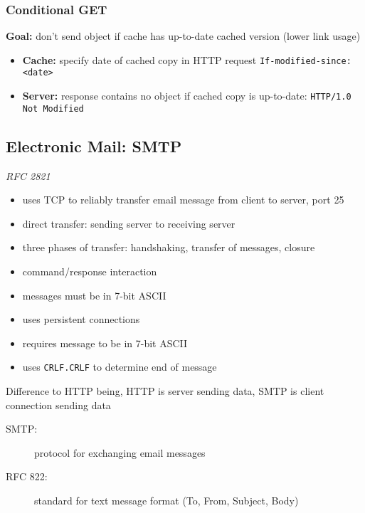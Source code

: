 \subsubsection{Conditional GET}
\begin{leftbar}
	\textbf{Goal:} don't send object if cache has up-to-date cached version (lower link usage)
\end{leftbar}
\begin{itemize}
	\item \textbf{Cache:} specify date of cached copy in HTTP request \texttt{If-modified-since: <date>}
	\item \textbf{Server:} response contains no object if cached copy is up-to-date: \texttt{HTTP/1.0 Not Modified}
\end{itemize}

\subsection{Electronic Mail: SMTP}\label{sec:smtp}
\textit{RFC 2821}
\begin{itemize}
	\item uses TCP to reliably transfer email message from client to server, port 25
	\item direct transfer: sending server to receiving server
	\item three phases of transfer: handshaking, transfer of messages, closure
	\item command/response interaction
	\item messages must be in 7-bit ASCII
	\item uses persistent connections
	\item requires message to be in 7-bit ASCII
	\item uses \texttt{CRLF.CRLF} to determine end of message
\end{itemize}
Difference to HTTP being, HTTP is server sending data, SMTP is client connection sending data\\
\begin{description}
	\item[SMTP:] protocol for exchanging email messages
	\item[RFC 822:] standard for text message format (To, From, Subject, Body)
\end{description}
